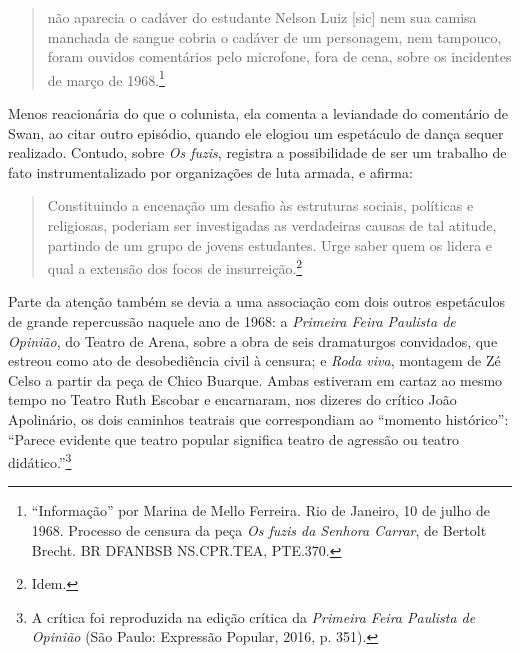 \begin{quote}
não aparecia o cadáver do estudante Nelson Luiz {[}sic{]} nem sua camisa
manchada de sangue cobria o cadáver de um personagem, nem tampouco,
foram ouvidos comentários pelo microfone, fora de cena, sobre os
incidentes de março de 1968.\footnote{“Informação” por Marina de Mello
  Ferreira. Rio de Janeiro, 10 de julho de 1968. Processo de censura da
  peça \textit{Os fuzis da Senhora Carrar}, de Bertolt Brecht. BR DFANBSB
  NS.CPR.TEA, PTE.370.}
\end{quote}

Menos reacionária do que o colunista, ela comenta a leviandade do
comentário de Swan, ao citar outro episódio, quando ele elogiou um
espetáculo de dança sequer realizado. Contudo, sobre \textit{Os fuzis},
registra a possibilidade de ser um trabalho de fato instrumentalizado
por organizações de luta armada, e afirma:

\begin{quote}
Constituindo a encenação um desafio às estruturas sociais, políticas e
religiosas, poderiam ser investigadas as verdadeiras causas de tal
atitude, partindo de um grupo de jovens estudantes. Urge saber quem os
lidera e qual a extensão dos focos de insurreição.\footnote{Idem.}
\end{quote}

Parte da atenção também se devia a uma associação com dois outros
espetáculos de grande repercussão naquele ano de 1968: a \textit{Primeira
Feira Paulista de Opinião}, do Teatro de Arena, sobre a obra de seis
dramaturgos convidados, que estreou como ato de desobediência civil à
censura; e \textit{Roda viva}, montagem de Zé Celso a partir da peça de
Chico Buarque. Ambas estiveram em cartaz ao mesmo tempo no Teatro Ruth
Escobar e encarnaram, nos dizeres do crítico João Apolinário, os dois
caminhos teatrais que correspondiam ao “momento histórico”: “Parece
evidente que teatro popular significa teatro de agressão ou teatro
didático.”\footnote{A crítica foi reproduzida na edição crítica da
  \textit{Primeira Feira Paulista de Opinião} (São Paulo: Expressão
  Popular, 2016, p. 351).}

